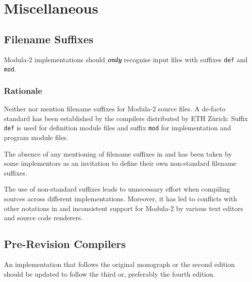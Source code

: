 \documentclass[10pt,a4paper]{article}
\renewcommand{\emph}[1]{\textbf{\textit{#1}}}
\begin{document}
\section{Miscellaneous}

\subsection{Filename Suffixes}

Modula-2 implementations should \emph{only} recognise input files with
suffixes \verb|def| and \verb|mod|.

\subsubsection{Rationale}

Neither \cite{Wirth78} nor \cite{Wirth88} mention filename suffixes for
Modula-2 source files. A de-facto standard has been established by the
compilers distributed by ETH Z\"{u}rich: Suffix \verb|def| is used for
definition module files and suffix \verb|mod| for implementation and program
module files.

The absence of any mentioning of filename suffixes in \cite{Wirth78} and
\cite{Wirth88} has been taken by some implementors as an invitation to
define their own non-standard filename suffixes.

The use of non-standard suffixes leads to unnecessary effort when compiling
sources across different implementations. Moreover, it has led to conflicts
with other notations in and inconsistent support for Modula-2 by various text
editors and source code renderers.


\subsection{Pre-Revision Compilers}
An implementation that follows the original monograph \cite{Wirth78} or the
second edition \cite{Wirth83} should be updated to follow the third
\cite{Wirth85} or, preferably the fourth \cite{Wirth88} edition.
\end{document}
